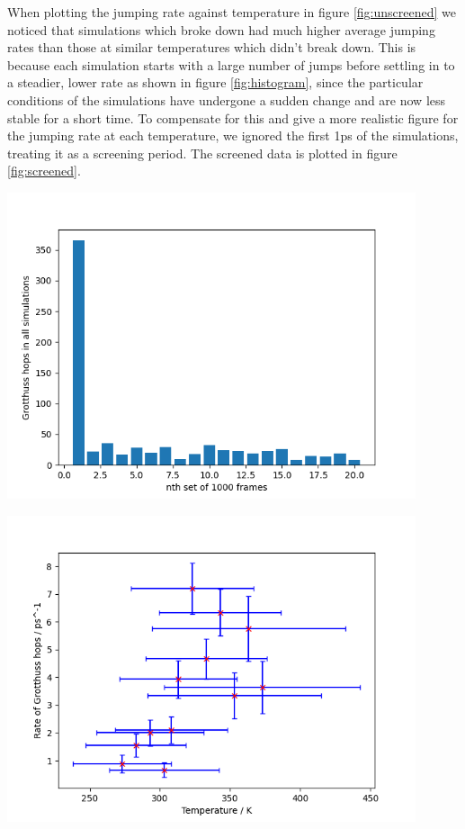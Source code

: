 \documentclass{article}
\newenvironment{Figure}{\par\medskip\noindent\minipage{\linewidth}}{\endminipage\par\medskip}
\begin{document}
\begin{multicols}{2}
When plotting the jumping rate against temperature in figure \ref{fig:unscreened} we noticed that simulations which broke down had much higher average jumping rates than those at similar temperatures which didn't break down. This is because each simulation starts with a large number of jumps before settling in to a steadier, lower rate as shown in figure \ref{fig:histogram}, since the particular conditions of the simulations have undergone a sudden change and are now less stable for a short time. To compensate for this and give a more realistic figure for the jumping rate at each temperature, we ignored the first 1ps of the simulations, treating it as a screening period. The screened data is plotted in figure \ref{fig:screened}.
\begin{Figure}
	\centering
	\includegraphics[width=0.9\textwidth]{figures/histogram.png}
	\label{fig:histogram}	
\end{Figure}

\begin{Figure}
	\centering
	\includegraphics[width=0.9\textwidth]{figures/screeneddata.png}
	\label{fig:screened}	
\end{Figure}

\end{multicols}
\end{document}
